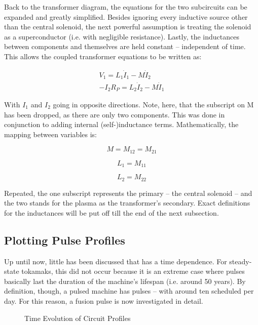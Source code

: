 Back to the transformer diagram, the equations for the two subcircuits can be expanded and greatly simplified. Besides ignoring every inductive source other than the central solenoid, the next powerful assumption is treating the solenoid as a superconductor (i.e. with negligible resistance). Lastly, the inductances between components and themselves are held constant -- independent of time. This allows the coupled transformer equations to be written as:

\begin{align}
	\label{eq:circ1}
	V_1 = L_1 \dot I_1 - M \dot I_2 \\
	\label{eq:circ2}
	-I_2 R_P = L_2 \dot I_2 - M \dot I_1
\end{align}

With $I_1$ and $I_2$ going in opposite directions. Note, here, that the subscript on M has been dropped, as there are only two components. This was done in conjunction to adding internal (self-)inductance terms. Mathematically, the mapping between variables is:

\begin{equation}
	M = M_{12} = M_{21}
\end{equation}

\begin{equation}
	L_1 = M_{11}\end{equation}

\begin{equation}
	L_2 = M_{22}
\end{equation}

Repeated, the one subscript represents the primary -- the central solenoid -- and the two stands for the plasma as the transformer's secondary. Exact definitions for the inductances will be put off till the end of the next subsection.

\subsection{Plotting Pulse Profiles}

Up until now, little has been discussed that has a time dependence. For steady-state tokamaks, this did not occur because it is an extreme case where pulses basically last the duration of the machine's lifespan (i.e. around 50 years). By definition, though, a pulsed machine has pulses -- with around ten scheduled per day. For this reason, a fusion pulse is now investigated in detail.

\begin{figure}[h!]
\centering

\caption{Time Evolution of Circuit Profiles}
\label{fig:circuit_profiles}
\end{figure}

